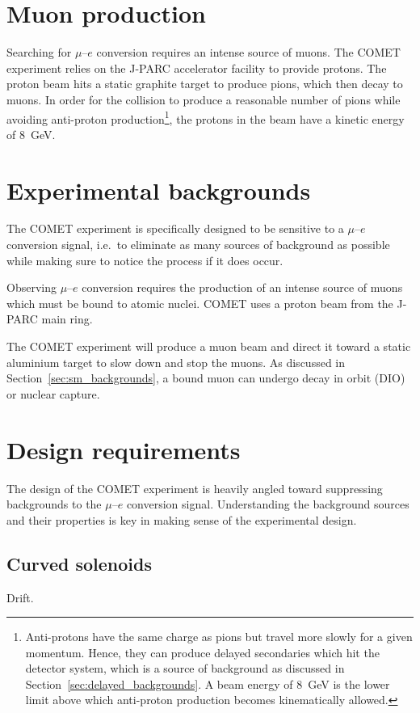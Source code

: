 \section{Muon production}
Searching for $\mu$--$e$ conversion requires an intense source of muons. The
COMET experiment relies on the J-PARC accelerator facility to provide protons.
The proton beam hits a static graphite target to produce pions, which then decay
to muons. In order for the collision to produce a reasonable number of pions
while avoiding anti-proton production\footnote{
Anti-protons have the same charge as pions but travel more slowly for a given
momentum. Hence, they can produce delayed secondaries which hit the detector
system, which is a source of background as discussed in
Section~\ref{sec:delayed_backgrounds}. A beam energy of \SI{8}{\GeV} is the
lower limit above which anti-proton production becomes kinematically allowed.
}, the protons in the beam have a kinetic energy of \SI{8}{\GeV}. 


\section{Experimental backgrounds}\label{sec:backgrounds}
The COMET experiment is specifically designed to be sensitive to a $\mu$--$e$
conversion signal, i.e.\ to eliminate as many sources of background as possible
while making sure to notice the process if it does occur. 

Observing $\mu$--$e$ conversion requires the production of an intense source of
muons which must be bound to atomic nuclei. COMET uses a proton beam from the
J-PARC main ring.


The COMET experiment will produce a muon beam and direct it toward a static
aluminium target to slow down and stop the muons. As discussed in
Section~\ref{sec:sm_backgrounds}, a bound muon can undergo decay in orbit (DIO)
or nuclear capture. 

\section{Design requirements}

The design of the COMET experiment is heavily angled toward suppressing
backgrounds to the $\mu$--$e$ conversion signal. Understanding the background
sources and their properties is key in making sense of the experimental design.

\subsection{Curved solenoids}\label{sec:curved_solenoids}
Drift.

